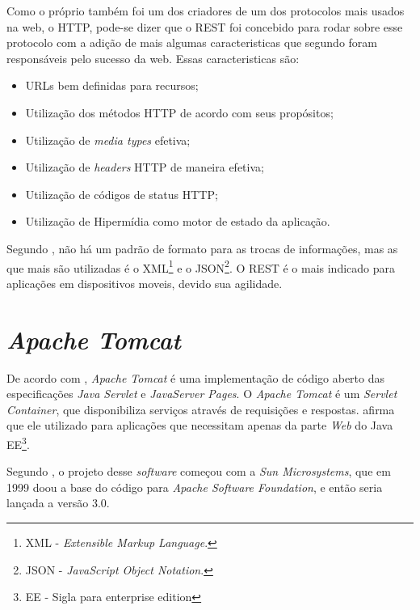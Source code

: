 	\par Como o próprio  também foi um dos criadores de um
dos protocolos mais usados na web, o HTTP, pode-se dizer que o REST foi
concebido para rodar sobre esse protocolo com a adição de mais algumas
caracteristicas que segundo  foram responsáveis pelo
sucesso da web. Essas caracteristicas são:

	\begin{itemize}
	  \item URLs bem definidas para recursos;
	  \item Utilização dos métodos HTTP de acordo com seus propósitos;
	  \item Utilização de \textit{media types} efetiva;
	  \item Utilização de \textit{headers} HTTP de maneira efetiva;
	  \item Utilização de códigos de status HTTP;
	  \item Utilização de Hipermídia como motor de estado da aplicação.
	\end{itemize}
	 
	\par Segundo , não há um padrão de formato para as
 trocas de informações, mas as que mais são utilizadas é o XML\footnote{XML
 - \textit{Extensible Markup Language}.} e o JSON\footnote{JSON - 
 \textit{JavaScript Object Notation}.}. O REST é o mais indicado para aplicações
 em dispositivos moveis, devido sua agilidade.
	
	
\section{\textit{Apache Tomcat}}

	\par De acordo com , \textit{Apache Tomcat} é uma
implementação de código aberto das especificações \textit{Java Servlet} e
\textit{JavaServer Pages}. O \textit{Apache Tomcat} é um \textit{Servlet
Container}, que disponibiliza serviços através de requisições e respostas.
 afirma que ele utilizado para aplicações que necessitam
apenas da parte \textit{Web} do Java EE\footnote{EE - Sigla para enterprise
edition}.

	\par Segundo , o projeto desse \textit{software}
começou com a \textit{Sun Microsystems}, que em 1999 doou a base do código para
\textit{Apache Software Foundation}, e então seria lançada a versão 3.0.

